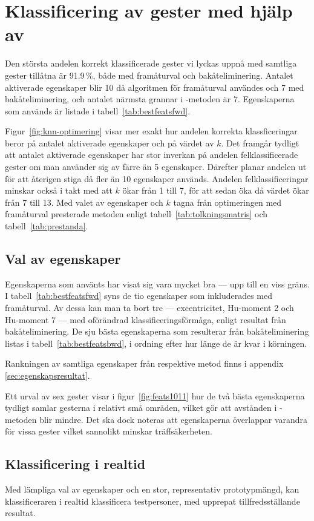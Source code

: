 \documentclass[../rapport_MVEX01-11-05]{subfiles}
\begin{document}
\section{Klassificering av gester med hjälp av \knn}
Den största andelen korrekt klassificerade gester vi lyckas uppnå
med samtliga gester tillåtna är 91.9\,\%, både med framåturval
och bakåteliminering. Antalet aktiverade
egenskaper blir 10 då algoritmen för framåturval användes och 7 med
bakåteliminering, och antalet närmsta grannar i \knn-metoden är 7. Egenskaperna som
används är listade i
tabell~\vref{tab:bestfeatsfwd}.

Figur~\vref{fig:knn-optimering} visar mer
exakt hur andelen korrekta
klassficeringar beror på antalet aktiverade egenskaper och på värdet av $k$.
Det framgår tydligt att antalet aktiverade egenskaper har stor
inverkan på andelen felklassificerade gester
om man använder sig av färre än
5 egenskaper. Därefter planar andelen ut för att återigen stiga då
fler än 10 egenskaper används. Andelen felklassificeringar
minskar också i takt med att $k$ ökar från 1 till 7, för att sedan
öka då värdet ökar från 7 till 13. Med valet av egenskaper och $k$ tagna från
optimeringen med framåturval presterade metoden enligt
tabell~\vref{tab:tolkningsmatris} och tabell~\vref{tab:prestanda}.

\subsection{Val av egenskaper}\label{sec:resultat_features}
Egenskaperna som använts har visat sig vara mycket bra --- upp till en viss gräns.
I tabell~\vref{tab:bestfeatsfwd} syns de tio egenskaper som inkluderades
med framåturval. Av dessa kan man ta bort tre --- excentricitet,
Hu-moment 2 och Hu-moment 7 ---
med oförändrad klassificeringsförmåga, enligt resultat från bakåteliminering.
De sju bästa egenskaperna som resulterar från
bakåteliminering listas i tabell~\vref{tab:bestfeatsbwd}, i
ordning efter hur länge de är kvar i körningen.

Rankningen av samtliga egenskaper från respektive metod finns i appendix
\ref{sec:egenskapsresultat}.

Ett urval av sex gester visar i
figur~\vref{fig:feats1011} hur de två bästa egenskaperna tydligt samlar 
gesterna i relativt små områden, vilket gör att avstånden i \knn-metoden 
blir mindre. Det ska dock noteras att egenskaperna 
överlappar varandra för vissa gester vilket sannolikt minskar träffsäkerheten.

\subsection{Klassificering i realtid}
Med lämpliga val av egenskaper och en stor, representativ prototypmängd,
kan klassificeraren i realtid klassificera testpersoner, med upprepat
tillfredsställande resultat.
\end{document}
